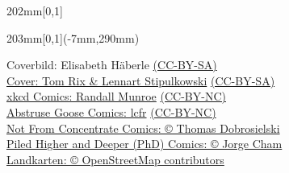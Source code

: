 {\begin{textblock*}{202mm}[0,1]
\begin{flushleft}
        \end{flushleft}
    \end{textblock*}

    \begin{textblock*}{203mm}[0,1](-7mm,290mm)
        \begin{flushright}
            \footnotesize
 	     	Coverbild: Elisabeth Häberle \href{http://
creativecommons.org/licenses/by-sa/4.0/}{(CC-BY-SA)}\\ %
		\href{http://mathphys.info/}{Cover: Tom Rix \& Lennart Stipulkowski} \href{http://
creativecommons.org/licenses/by-sa/4.0/}{(CC-BY-SA)}\\ %
            \href{http://xkcd.com/}{xkcd Comics: Randall Munroe} \href{http://creativecommons.org/licenses/by-nc/2.5/}{(CC-BY-NC)}\\
            \href{http://abstrusegoose.com/}{Abstruse Goose Comics: lcfr} \href{http://creativecommons.org/licenses/by-nc/3.0/us/}{(CC-BY-NC)}\\
            \href{http://nfccomic.com/index.php}{Not From Concentrate Comics: \copyright{} Thomas Dobrosielski}\\
            \href{http://www.phdcomics.com/}{Piled Higher and Deeper (PhD) Comics: \copyright{} Jorge Cham}\\
		\href{http://www.openstreetmap.org/}{Landkarten: \copyright{} OpenStreetMap contributors} 
        \end{flushright}
    \end{textblock*}
}

\graphicspath{{./bilder/}{./}}



